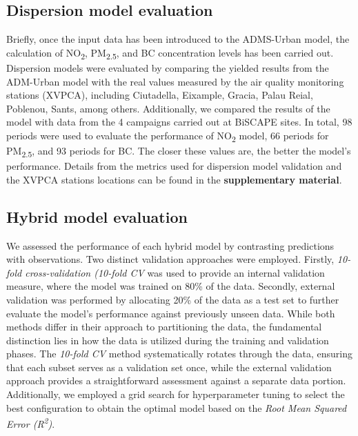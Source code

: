 \documentclass{article}
\begin{document}
\subsection{Dispersion model evaluation}
Briefly, once the input data has been introduced to the ADMS-Urban model, the calculation of NO\textsubscript{2}, PM\textsubscript{2.5}, and BC concentration levels has been carried out. Dispersion models were evaluated by comparing the yielded results from the ADM-Urban model with the real values measured by the air quality monitoring stations (XVPCA), including Ciutadella, Eixample, Gracia, Palau Reial, Poblenou, Sants, among others. Additionally, we compared the results of the model with data from the 4 campaigns carried out at BiSCAPE sites. In total, 98 periods were used to evaluate the performance of NO\textsubscript{2} model, 66 periods for PM\textsubscript{2.5}, and 93 periods for BC. The closer these values are, the better the model's performance. Details from the metrics used for dispersion model validation and the XVPCA stations locations can be found in the \textbf{supplementary material}.

\subsection{Hybrid model evaluation}
We assessed the performance of each hybrid model by contrasting predictions with observations. Two distinct validation approaches were employed. Firstly, \textit{10-fold cross-validation (10-fold CV} was used to provide an internal validation measure, where the model was trained on 80\% of the data. Secondly, external validation was performed by allocating 20\% of the data as a test set to further evaluate the model's performance against previously unseen data. While both methods differ in their approach to partitioning the data, the fundamental distinction lies in how the data is utilized during the training and validation phases. The \textit{10-fold CV} method systematically rotates through the data, ensuring that each subset serves as a validation set once, while the external validation approach provides a straightforward assessment against a separate data portion. Additionally, we employed a grid search for hyperparameter tuning to select the best configuration to obtain the optimal model based on the \textit{Root Mean Squared Error (R\textsuperscript{2})}. 
\end{document}
